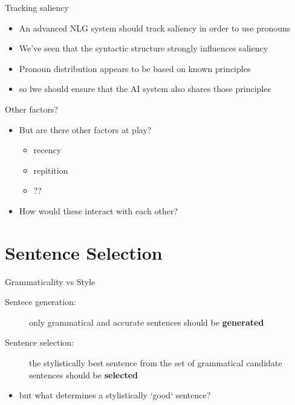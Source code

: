 \documentclass[10pt, compress]{beamer}
\begin{document}
\begin{frame}{Tracking saliency}
	\begin{itemize}
		\item An advanced NLG system should track saliency in order to use pronouns
		\item We've seen that the syntactic structure strongly influences saliency \pause
		\item Pronoun distribution appears to be based on known principles
		\item so lwe should ensure that the AI system also shares those principles
	\end{itemize}
\end{frame}

\begin{frame}{Other factors?}
	\begin{itemize}
		\item But are there other factors at play? \pause
		\begin{itemize}
			\item recency
			\item repitition
			\item ?? \pause
		\end{itemize}
		\item How would these interact with each other?
	\end{itemize}
\end{frame}


\section{Sentence Selection}
\begin{frame}{Grammaticality vs Style}
    \begin{description}
        \item[Sentece generation:] only grammatical and accurate sentences should be {\bf generated}
        \item[Sentence selection:] the stylistically best sentence from the set of grammatical candidate sentences should be {\bf selected} \pause
    \end{description}

    \begin{itemize}
        \item but what determines a stylistically `good` sentence?
    \end{itemize}
\end{frame}
\end{document}
